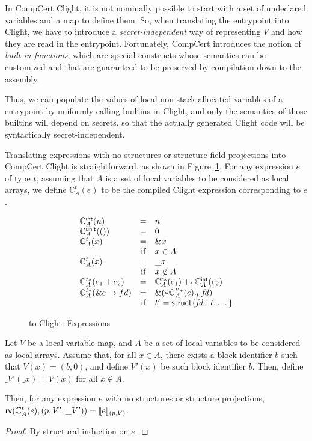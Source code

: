 In CompCert Clight, it is not nominally possible to start with a set
of undeclared variables and a map to define them. So, when translating
the \cstar entrypoint into Clight, we have to introduce a
\emph{secret-independent} way of representing $V$ and how they are
read in the entrypoint. Fortunately, CompCert introduces the notion of
\emph{built-in functions}, which are special constructs whose
semantics can be customized and that are guaranteed to be preserved by
compilation down to the assembly.

Thus, we can populate the values of local non-stack-allocated
variables of a \cstar entrypoint by uniformly calling builtins in Clight,
and only the semantics of those builtins will depend on secrets, so
that the actually generated Clight code will be syntactically
secret-independent.

Translating  expressions with no structures or structure field
projections into CompCert Clight is straightforward, as shown in
Figure~\ref{fig:cstar-2-to-clight-expr}. For any  expression $e$ of
type $t$, assuming that $A$ is a set of local variables to be
considered as local arrays, we define $\mathbb C^t_A(e)$ to be the
compiled Clight expression corresponding to $e$.

\begin{figure}
  \[
  \begin{array}{lcl}
    \mathbb C^{\text{\textsf{int}}}_A (n) & = & n \\
    \mathbb C^{\text{\textsf{unit}}}_A (()) & = & 0 \\
    \mathbb C^t_A (x) & = & \&x \\
     & \text{if} & x \in A \\
    \mathbb C^t_A (x) & = & \_x \\
     & \text{if} & x \not\in A \\
    \mathbb C^{t*}_A (e_1 + e_2) & = & \mathbb C^{t*}_A (e_1) +_t \mathbb C^{\text{\textsf{int}}}_A (e_2) \\
    \mathbb C^{t*}_A (\&e \rightarrow fd) & = & \&(*\mathbb C^{t'*}_A (e) ._{t'}\mathit{fd}) \\
    & \text{if} & t' = \text{\textsf{struct}}\{ \mathit{fd} : t, \dots \}
  \end{array}
  \]
  \caption{ to Clight: Expressions}
  \label{fig:cstar-2-to-clight-expr}
\end{figure}

\begin{lemma}
  Let $V$ be a  local variable map, and $A$ be a set of local
  variables to be considered as local arrays. Assume that, for all $x
  \in A$, there exists a block identifier $b$ such that $V(x) = (b,
  0)$, and define $V'(x)$ be such block identifier $b$. Then, define
  $\_V'(\_x) = V(x)$ for all $x \not\in A$.

  Then, for any expression $e$ with no structures or structure
  projections, $\text{\textsf{rv}}(\mathbb C^t_A (e), (p, V', \_V')) = \llbracket
  e \rrbracket_{(p, V)}$.
\end{lemma}
\begin{proof}
  By structural induction on $e$. 
\end{proof}

